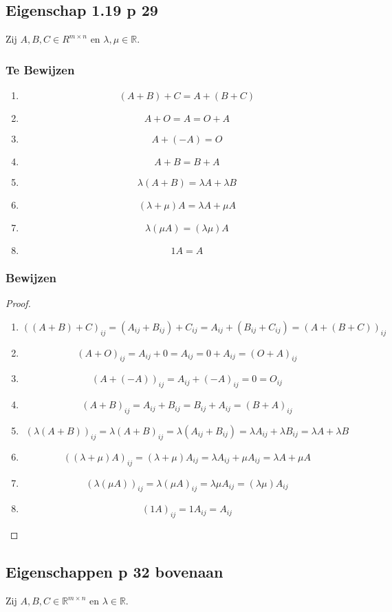 \documentclass[lineaire_algebra_oplossingen.tex]{subfiles}
\begin{document}
\subsection{Eigenschap 1.19 p 29}
Zij $A,B,C \in R^{m\times n}$ en $\lambda, \mu \in \mathbb{R}$.
\subsubsection*{Te Bewijzen}
\begin{enumerate}
\item \[ (A+B)+C=A+(B+C) \]
\item \[ A+O = A = O+A \]
\item \[ A + (-A) = O \]
\item \[ A+B = B+A \]
\item \[ \lambda(A+B) = \lambda A+ \lambda B \]
\item \[ (\lambda+\mu)A = \lambda A+\mu A \]
\item \[ \lambda(\mu A) = (\lambda\mu)A\]
\item \[ 1A =A \]
\end{enumerate}
\subsubsection*{Bewijzen}
\begin{proof}
\begin{enumerate}
\item 
\[
((A+B)+C)_{ij} = (A_{ij} + B_{ij}) + C_{ij} = A_{ij} + (B_{ij} + C_{ij}) = (A+(B+C))_{ij}
\]
\item
\[ (A+O)_{ij} = A_{ij} + 0 = A_{ij} = 0 + A_{ij} = (O+A)_{ij} \]
\item
\[ (A + (-A))_{ij} = A_{ij} + (-A)_{ij} = 0 = O_{ij} \]
\item
\[ (A+B)_{ij} = A_{ij} + B_{ij} = B_{ij} + A_{ij} = (B+A)_{ij} \]
\item
\[ (\lambda(A+B))_{ij} = \lambda(A+B)_{ij} = \lambda (A_{ij} + B_{ij}) = \lambda A_{ij}+ \lambda B_{ij}  = \lambda A+ \lambda B \]
\item
\[ ((\lambda+\mu)A)_{ij} = (\lambda+\mu)A_{ij} = \lambda A_{ij}+\mu A_{ij} = \lambda A+\mu A \]
\item
\[ (\lambda(\mu A))_{ij} = \lambda(\mu A)_{ij} =\lambda\mu A_{ij} = (\lambda\mu)A_{ij}\]
\item
\[ (1A)_{ij}= 1A_{ij} =A_{ij} \]
\end{enumerate}
\end{proof}

\subsection{Eigenschappen p 32 bovenaan}
Zij $A,B,C \in \mathbb{R}^{m\times n}$ en $\lambda \in \mathbb{R}$.
\end{document}
